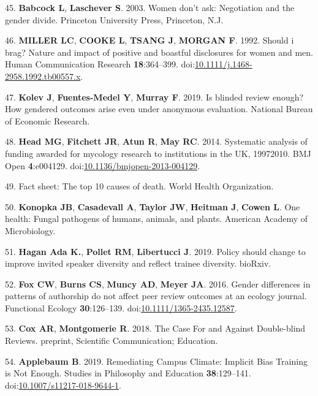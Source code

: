 \documentclass[11pt,]{article}
\begin{document}
\hypertarget{ref-babcock_women_2003}{}
45. \textbf{Babcock L}, \textbf{Laschever S}. 2003. Women don't ask:
Negotiation and the gender divide. Princeton University Press,
Princeton, N.J.

\hypertarget{ref-MILLER1992}{}
46. \textbf{MILLER LC}, \textbf{COOKE L}, \textbf{TSANG J},
\textbf{MORGAN F}. 1992. Should i brag? Nature and impact of positive
and boastful disclosures for women and men. Human Communication Research
\textbf{18}:364--399.
doi:\href{https://doi.org/10.1111/j.1468-2958.1992.tb00557.x}{10.1111/j.1468-2958.1992.tb00557.x}.

\hypertarget{ref-Kolev2019}{}
47. \textbf{Kolev J}, \textbf{Fuentes-Medel Y}, \textbf{Murray F}. 2019.
Is blinded review enough? How gendered outcomes arise even under
anonymous evaluation. National Bureau of Economic Research.

\hypertarget{ref-Head2014}{}
48. \textbf{Head MG}, \textbf{Fitchett JR}, \textbf{Atun R}, \textbf{May
RC}. 2014. Systematic analysis of funding awarded for mycology research
to institutions in the UK, 19972010. BMJ Open \textbf{4}:e004129.
doi:\href{https://doi.org/10.1136/bmjopen-2013-004129}{10.1136/bmjopen-2013-004129}.

\hypertarget{ref-WHO_2018}{}
49. Fact sheet: The top 10 causes of death. World Health Organization.

\hypertarget{ref-ASM_2019}{}
50. \textbf{Konopka JB}, \textbf{Casadevall A}, \textbf{Taylor JW},
\textbf{Heitman J}, \textbf{Cowen L}. One health: Fungal pathogens of
humans, animals, and plants. American Academy of Microbiology.

\hypertarget{ref-Hagan_2019}{}
51. \textbf{Hagan \textnormal{Ada K.}}, \textbf{Pollet RM},
\textbf{Libertucci J}. 2019. Policy should change to improve invited
speaker diversity and reflect trainee diversity. bioRxiv.

\hypertarget{ref-fox_gender_2016}{}
52. \textbf{Fox CW}, \textbf{Burns CS}, \textbf{Muncy AD}, \textbf{Meyer
JA}. 2016. Gender differences in patterns of authorship do not affect
peer review outcomes at an ecology journal. Functional Ecology
\textbf{30}:126--139.
doi:\href{https://doi.org/10.1111/1365-2435.12587}{10.1111/1365-2435.12587}.

\hypertarget{ref-cox_case_2018}{}
53. \textbf{Cox AR}, \textbf{Montgomerie R}. 2018. The Case For and
Against Double-blind Reviews. preprint, Scientific Communication;
Education.

\hypertarget{ref-applebaum_remediating_2019}{}
54. \textbf{Applebaum B}. 2019. Remediating Campus Climate: Implicit
Bias Training is Not Enough. Studies in Philosophy and Education
\textbf{38}:129--141.
doi:\href{https://doi.org/10.1007/s11217-018-9644-1}{10.1007/s11217-018-9644-1}.
\end{document}
